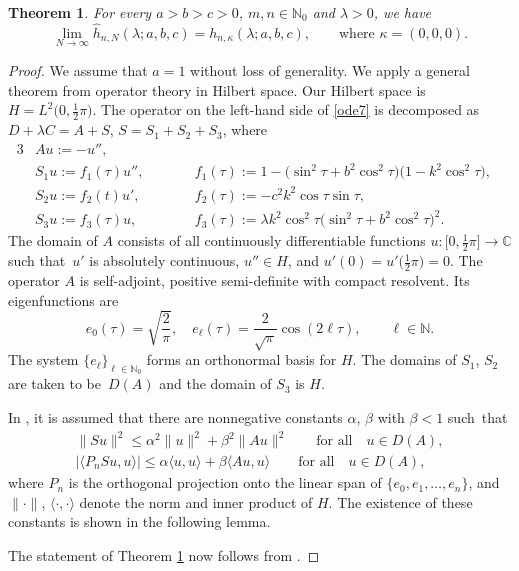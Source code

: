 \documentclass[10pt,a4paper]{amsart}
\newtheorem{thm}{Theorem}[section]
\newcommand{\C}{\mathbb{C}}
\newcommand{\N}{\mathbb{N}}
\numberwithin{equation}{section}
\begin{document}
\begin{thm}\label{convergence}
For every $a>b>c>0$, $m,n\in\N_0$ and $\lambda>0$, we have
\[ \lim_{N\to\infty} \hat h_{n,N}(\lambda;a,b,c)=h_{n,\kappa}(\lambda;a,b,c),\qquad \text{where $\kappa=(0,0,0)$}.
\]
\end{thm}

\begin{proof}
We assume that $a=1$ without loss of generality. We apply a general theorem \cite[Theorem B.1]{V}
from operator theory in Hilbert space.
Our Hilbert space is $H=L^2\bigl(0,\tfrac12\pi\bigr)$. The operator on the left-hand side of \eqref{ode7}
is decomposed as $D+\lambda C=A+S$, $S=S_1+S_2+S_3$,
where
\begin{alignat*}{3}
& A u:=-u'',&&& \\
&S_1u:=f_1(\tau)u'',\qquad &&f_1(\tau):=1-\bigl(\sin^2\tau+b^2\cos^2\tau\bigr)\bigl(1-k^2\cos^2\tau\bigr),&\\
&S_2u:=f_2(t)u',\qquad&& f_2(\tau):=-c^2k^2\cos\tau\sin\tau,&\\
&S_3u:=f_3(\tau) u,\qquad&& f_3(\tau):=\lambda k^2\cos^2 \tau\bigl(\sin^2\tau+b^2\cos^2\tau\bigr)^2.&
\end{alignat*}
The domain of $A$ consists of all continuously differentiable functions $u\colon \big[0,\frac12\pi\big]\to\C$
such that~$u'$ is absolutely continuous, $u''\in H$, and $u'(0)=u'\bigl(\frac12\pi\bigr)=0$.
The operator $A$ is self-adjoint, positive semi-definite with compact resolvent. Its eigenfunctions are
\[ e_0(\tau)=\sqrt{\frac2\pi},\quad e_\ell(\tau)=\frac{2}{\sqrt\pi}\cos(2\ell\tau),\qquad \ell\in\N.\]
The system $\{e_\ell\}_{\ell\in\N_0}$ forms an orthonormal basis for $H$.
The domains of $S_1$, $S_2$ are taken to be~$D(A)$ and the domain of $S_3$ is $H$.

In \cite[Theorem B.1]{V}, it is assumed that there are nonnegative constants $\alpha$, $\beta$ with $\beta<1$ such~that
\begin{gather}\label{cond1}
\|Su\|^2\le \alpha^2\|u\|^2+\beta^2\|Au\|^2\qquad\text{for all} \quad u\in D(A),\\
|\langle P_nSu,u\rangle|\le \alpha \langle u,u\rangle+\beta\langle Au,u\rangle\qquad \text{for all} \quad u\in D(A),\label{cond2}
\end{gather}
where $P_n$ is the orthogonal projection onto the linear span of $\{e_0,e_1,\dots,e_n\}$,
and $\|\cdot\|$, $\langle \cdot,\cdot\rangle$ denote the norm and inner product of $H$.
The existence of these constants is shown in the following lemma.

The statement of Theorem \ref{convergence} now follows from \cite[Theorems B.1 and B.2]{V}.
\end{proof}
\end{document}
